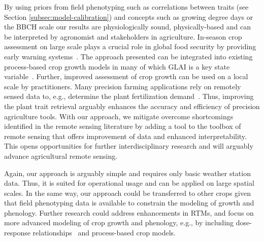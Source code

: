 By using priors from field phenotyping such as correlations between traits (see Section \ref{subsec:model-calibration}) and concepts such as growing degree days or the BBCH scale our results are physiologically sound, physically-based and can be interpreted by agronomist and stakeholders in agriculture. In-season crop assessment on large scale plays a crucial role in global food security by providing early warning systems~\citep{becker-reshef_strengthening_2020}. The approach presented can be integrated into existing process-based crop growth models in many of which GLAI is a key state variable~\citep{delecolle_remote_1992}. Further, improved assessment of crop growth can be used on a local scale by practitioners. Many precision farming applications rely on remotely sensed data to, e.g., determine the plant fertilization demand~\citep{argento_site-specific_2021,argento_investigating_2022}. Thus, improving the plant trait retrieval arguably enhances the accuracy and efficiency of precision agriculture tools. With our approach, we mitigate overcome shortcomings identified in the remote sensing literature by adding a tool to the toolbox of remote sensing that offers improvement of data and enhanced interpretability. This opens opportunities for further interdisciplinary research and will arguably advance agricultural remote sensing. 

Again, our approach is arguably simple and requires only basic weather station data. Thus, it is suited for operational usage and can be applied on large spatial scales. In the same way, our approach could be transferred to other crops given that field phenotyping data is available to constrain the modeling of growth and phenology. Further research could address enhancements in RTMs, and focus on more advanced modeling of crop growth and phenology, e.g., by including dose-response relationships~\citep{roth_phenomics_2021,roth_phenomics_2022} and process-based crop models.


